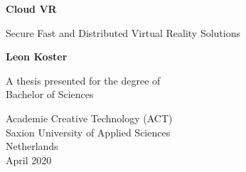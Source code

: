 \begin{titlepage}
   \begin{center}
       \vspace*{1cm}

       \textbf{Cloud VR}

       \vspace{0.5cm}
        Secure Fast and Distributed Virtual Reality Solutions
            
       \vspace{1.5cm}

       \textbf{Leon Koster}

       \vfill
            
       A thesis presented for the degree of\\
       Bachelor of Sciences
            
       \vspace{0.8cm}
     
            
       Academie Creative Technology (ACT)\\
       Saxion University of Applied Sciences\\
       Netherlands\\
       April 2020
            
   \end{center}
\end{titlepage}